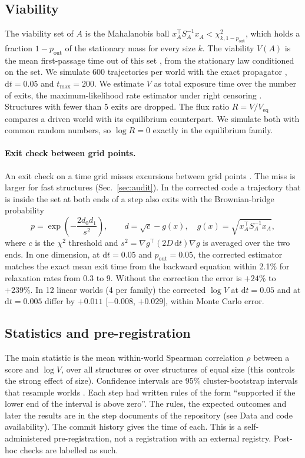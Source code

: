 \documentclass[11pt]{article}
\newcommand{\pout}{p_{\mathrm{out}}}
\begin{document}
\subsection{Viability}
The viability set of $A$ is the Mahalanobis ball $x_A^\top S_A^{-1} x_A < \chi^2_{k,1-\pout}$, which holds a fraction
$1-\pout$ of the stationary mass for every size $k$. The viability $V(A)$ is the mean first-passage time out of this set
\cite{Redner01,Aubin91}, from the stationary law conditioned on the set. We simulate 600 trajectories per world with the
exact propagator \cite{Gillespie96}, $\mathrm{d}t = 0.05$ and $t_{\max}=200$. We estimate $V$ as total exposure time over
the number of exits, the maximum-likelihood rate estimator under right censoring \cite{CoxOakes84}. Structures with
fewer than 5 exits are dropped. The flux ratio $R = V/V_{\mathrm{eq}}$ compares a driven world with its equilibrium
counterpart. We simulate both with common random numbers, so $\log R = 0$ exactly in the equilibrium family.

\paragraph{Exit check between grid points.} An exit check on a time grid misses excursions between grid points
\cite{Mannella99,BroadieGlassermanKou97}. The miss is larger for fast structures (Sec.~\ref{sec:audit}). In the
corrected code a trajectory that is inside the set at both ends of a step also exits with the Brownian-bridge
probability
\begin{equation}
  p = \exp\!\left(-\frac{2 d_0 d_1}{s^2}\right), \qquad d = \sqrt{c} - g(x), \quad g(x) = \sqrt{x_A^\top S_A^{-1} x_A},
\end{equation}
where $c$ is the $\chi^2$ threshold and $s^2 = \nabla g^\top (2D\,\mathrm{d}t)\nabla g$ is averaged over the two ends.
In one dimension, at $\mathrm{d}t=0.05$ and $\pout=0.05$, the corrected estimator matches the exact mean exit time from
the backward equation within 2.1\% for relaxation rates from 0.3 to 9. Without the correction the error is $+24\%$ to
$+239\%$. In 12 linear worlds (4 per family) the corrected $\log V$ at $\mathrm{d}t = 0.05$ and at $\mathrm{d}t=0.005$ differ by
$+0.011$ [$-0.008$, $+0.029$], within Monte Carlo error.

\subsection{Statistics and pre-registration}
The main statistic is the mean within-world Spearman correlation $\rho$ between a score and $\log V$, over all
structures or over structures of equal size (this controls the strong effect of size). Confidence intervals are 95\%
cluster-bootstrap intervals that resample worlds \cite{Efron79,CameronMiller15}. Each step had written rules of the form
``supported if the lower end of the interval is above zero''. The rules, the expected outcomes and later the results are
in the step documents of the repository (see Data and code availability). The commit history gives the time of each. This is a
self-administered pre-registration, not a registration with an external registry. Post-hoc checks are labelled as such.
\end{document}
